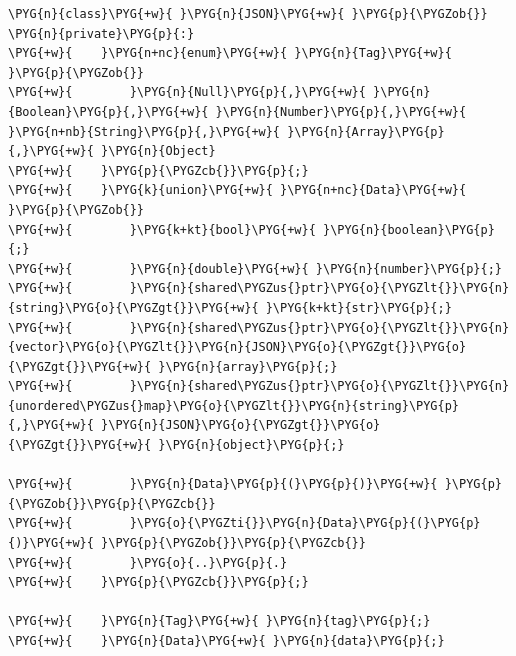 \begin{Verbatim}[commandchars=\\\{\},breaklines=true,breakanywhere=true,fontsize=\codefont,xleftmargin=17bp]
\PYG{n}{class}\PYG{+w}{ }\PYG{n}{JSON}\PYG{+w}{ }\PYG{p}{\PYGZob{}}
\PYG{n}{private}\PYG{p}{:}
\PYG{+w}{    }\PYG{n+nc}{enum}\PYG{+w}{ }\PYG{n}{Tag}\PYG{+w}{ }\PYG{p}{\PYGZob{}}
\PYG{+w}{        }\PYG{n}{Null}\PYG{p}{,}\PYG{+w}{ }\PYG{n}{Boolean}\PYG{p}{,}\PYG{+w}{ }\PYG{n}{Number}\PYG{p}{,}\PYG{+w}{ }\PYG{n+nb}{String}\PYG{p}{,}\PYG{+w}{ }\PYG{n}{Array}\PYG{p}{,}\PYG{+w}{ }\PYG{n}{Object}
\PYG{+w}{    }\PYG{p}{\PYGZcb{}}\PYG{p}{;}
\PYG{+w}{    }\PYG{k}{union}\PYG{+w}{ }\PYG{n+nc}{Data}\PYG{+w}{ }\PYG{p}{\PYGZob{}}
\PYG{+w}{        }\PYG{k+kt}{bool}\PYG{+w}{ }\PYG{n}{boolean}\PYG{p}{;}
\PYG{+w}{        }\PYG{n}{double}\PYG{+w}{ }\PYG{n}{number}\PYG{p}{;}
\PYG{+w}{        }\PYG{n}{shared\PYGZus{}ptr}\PYG{o}{\PYGZlt{}}\PYG{n}{string}\PYG{o}{\PYGZgt{}}\PYG{+w}{ }\PYG{k+kt}{str}\PYG{p}{;}
\PYG{+w}{        }\PYG{n}{shared\PYGZus{}ptr}\PYG{o}{\PYGZlt{}}\PYG{n}{vector}\PYG{o}{\PYGZlt{}}\PYG{n}{JSON}\PYG{o}{\PYGZgt{}}\PYG{o}{\PYGZgt{}}\PYG{+w}{ }\PYG{n}{array}\PYG{p}{;}
\PYG{+w}{        }\PYG{n}{shared\PYGZus{}ptr}\PYG{o}{\PYGZlt{}}\PYG{n}{unordered\PYGZus{}map}\PYG{o}{\PYGZlt{}}\PYG{n}{string}\PYG{p}{,}\PYG{+w}{ }\PYG{n}{JSON}\PYG{o}{\PYGZgt{}}\PYG{o}{\PYGZgt{}}\PYG{+w}{ }\PYG{n}{object}\PYG{p}{;}

\PYG{+w}{        }\PYG{n}{Data}\PYG{p}{(}\PYG{p}{)}\PYG{+w}{ }\PYG{p}{\PYGZob{}}\PYG{p}{\PYGZcb{}}
\PYG{+w}{        }\PYG{o}{\PYGZti{}}\PYG{n}{Data}\PYG{p}{(}\PYG{p}{)}\PYG{+w}{ }\PYG{p}{\PYGZob{}}\PYG{p}{\PYGZcb{}}
\PYG{+w}{        }\PYG{o}{..}\PYG{p}{.}
\PYG{+w}{    }\PYG{p}{\PYGZcb{}}\PYG{p}{;}

\PYG{+w}{    }\PYG{n}{Tag}\PYG{+w}{ }\PYG{n}{tag}\PYG{p}{;}
\PYG{+w}{    }\PYG{n}{Data}\PYG{+w}{ }\PYG{n}{data}\PYG{p}{;}


\end{Verbatim}
